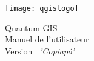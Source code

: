 
\begin{titlepage}
\begin{center}

\begin{center}
\texttt{[image: qgislogo]} 
\end{center}

\Huge{Quantum GIS}\\
\vspace{0.5cm}
\Large{Manuel de l'utilisateur} \\
\vspace{0.5cm}
\Large{Version ~\CURRENT \textsl{'Copiapó'}}

\end{center}
\end{titlepage}
